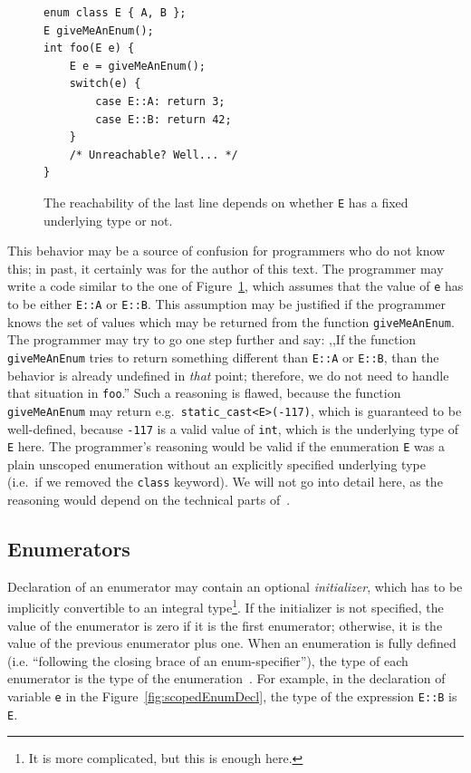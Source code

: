 \documentclass[nolot,nolof,nocover,printed]{fithesis3}
\newcommand{\stdN}[2]{\cite[#2]{#1}\xspace}
\begin{document}
\begin{figure}
\begin{lstlisting}
enum class E { A, B };
E giveMeAnEnum();
int foo(E e) {
	E e = giveMeAnEnum();
	switch(e) {
		case E::A: return 3;
		case E::B: return 42;
	}
	/* Unreachable? Well... */
}
\end{lstlisting}
\caption{The reachability of the last line depends on whether \texttt{E} has a fixed underlying type or not.}
\label{fig:enumNotReallyUnreachable}
\end{figure}

This behavior may be a source of confusion for programmers who do not know this; in past, it certainly was for the author of this text. The programmer may write a code similar to the one of Figure~\ref{fig:enumNotReallyUnreachable}, which assumes that the value of \texttt{e} has to be either \texttt{E::A} or \texttt{E::B}. This assumption may be justified if the programmer knows the set of values which may be returned from the function \texttt{giveMeAnEnum}. The programmer may try to go one step further and say: ,,If the function \texttt{giveMeAnEnum} tries to return something different than \texttt{E::A} or \texttt{E::B}, than the behavior is already undefined in \textit{that} point; therefore, we do not need to handle that situation in \texttt{foo}.'' Such a reasoning is flawed, because the function \texttt{giveMeAnEnum} may return e.g.~\lstinline|static_cast<E>(-117)|, which is guaranteed to be well-defined, because \lstinline|-117| is a valid value of \texttt{int}, which is the underlying type of \texttt{E} here. The programmer's reasoning would be valid if the enumeration \texttt{E} was a plain unscoped enumeration without an explicitly specified underlying type (i.e.~if we removed the \texttt{class} keyword). We will not go into detail here, as the reasoning would depend on the technical parts of~\stdN{n4296}{\S 7.2/8}.

\subsection{Enumerators}\label{sec:enumerators}

Declaration of an enumerator may contain an optional \textit{initializer}, which has to be implicitly convertible to an integral type\footnote{It is more complicated, but this is enough here.}. If the initializer is not specified, the value of the enumerator is zero if it is the first enumerator; otherwise, it is the value of the previous enumerator plus one. When an enumeration is fully defined (i.e. \enquote{following the closing brace of an enum-specifier}), the type of each enumerator is the type of the enumeration~\stdN{n4296}{\S 7.2/5}. For example, in the declaration of variable \texttt{e} in the Figure~\ref{fig:scopedEnumDecl}, the type of the expression \lstinline|E::B| is \texttt{E}.
\end{document}
